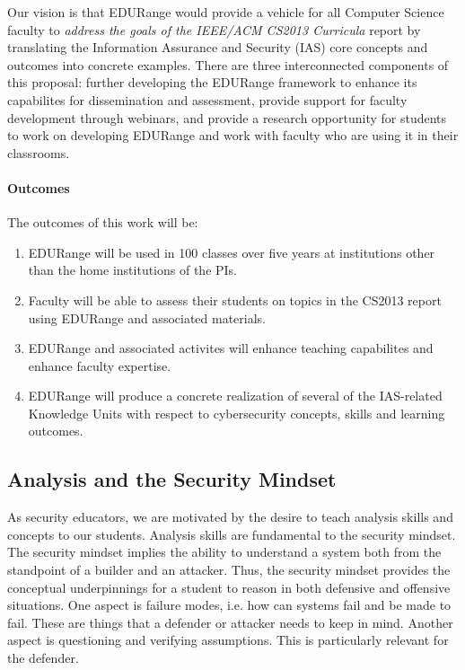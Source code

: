 Our vision is that EDURange would provide a vehicle for all Computer Science faculty to {\em address the goals of 
the IEEE/ACM CS2013
Curricula} report by translating the Information Assurance and Security (IAS) core concepts and outcomes into
concrete examples.  There are three interconnected components of this proposal: further developing the
EDURange framework to enhance its capabilites for dissemination and assessment, provide support for faculty development
through webinars, and provide a research opportunity for students to work on developing EDURange and work
with faculty who are using it in their classrooms.
\paragraph{Outcomes}
The outcomes of this work will be:
\begin{enumerate}
\item EDURange will be used in 100 classes over five years at institutions other than the home institutions of
  the PIs.
\item Faculty will be able to assess their students on topics in the CS2013 report using EDURange and 
  associated materials.
\item EDURange and associated activites will enhance teaching capabilites and enhance faculty expertise.
\item EDURange will produce a concrete realization of several of the IAS-related Knowledge Units
  with respect to cybersecurity concepts, skills and learning outcomes.
\end{enumerate}



\subsection{Analysis and the Security Mindset}
As security educators, we are motivated by the desire to teach analysis skills and concepts
to our students.
Analysis skills are fundamental to the security mindset.  The security
mindset implies the ability to understand a system both from the
standpoint of a builder and an attacker.  Thus, the security mindset
provides the conceptual underpinnings for a student to reason in both
defensive and offensive situations.  One aspect is failure modes,
i.e. how can systems fail and be made to fail.  These are things that
a defender or attacker needs to keep in mind.  Another aspect is
questioning and verifying assumptions.  This is particularly relevant
for the defender.

